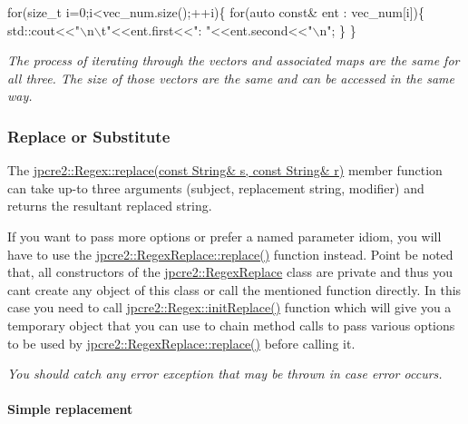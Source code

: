 \begin{DoxyCode}
\textcolor{keywordflow}{for}(\textcolor{keywordtype}{size\_t} i=0;i<vec\_num.size();++i)\{
    \textcolor{keywordflow}{for}(\textcolor{keyword}{auto} \textcolor{keyword}{const}& ent : vec\_num[i])\{
        std::cout<<\textcolor{stringliteral}{"\(\backslash\)n\(\backslash\)t"}<<ent.first<<\textcolor{stringliteral}{": "}<<ent.second<<\textcolor{stringliteral}{"\(\backslash\)n"};
    \}
\}
\end{DoxyCode}


{\itshape The process of iterating through the vectors and associated maps are the same for all three. The size of those vectors are the same and can be accessed in the same way.}\hypertarget{index_replace}{}\subsubsection{Replace or Substitute}\label{index_replace}
The {\ttfamily \hyperlink{classjpcre2_1_1Regex_addd7c21abd0f4cf6c532a7602cfb5835}{jpcre2\+::\+Regex\+::replace(const String\& s, const String\& r)}} member function can take up-\/to three arguments (subject, replacement string, modifier) and returns the resultant replaced string.

If you want to pass more options or prefer a named parameter idiom, you will have to use the {\ttfamily \hyperlink{classjpcre2_1_1RegexReplace_afd087fa7a9bfedec802d1a3dd7edbdd0}{jpcre2\+::\+Regex\+Replace\+::replace()}} function instead. Point be noted that, all constructors of the {\ttfamily \hyperlink{classjpcre2_1_1RegexReplace}{jpcre2\+::\+Regex\+Replace}} class are private and thus you can\textquotesingle{}t create any object of this class or call the mentioned function directly. In this case you need to call {\ttfamily \hyperlink{classjpcre2_1_1Regex_ae7235a991492fa88f1bd3fb02d59cd0a}{jpcre2\+::\+Regex\+::init\+Replace()}} function which will give you a temporary object that you can use to chain method calls to pass various options to be used by {\ttfamily \hyperlink{classjpcre2_1_1RegexReplace_afd087fa7a9bfedec802d1a3dd7edbdd0}{jpcre2\+::\+Regex\+Replace\+::replace()}} before calling it.

{\itshape You should catch any error exception that may be thrown in case error occurs.}\hypertarget{index_simple-replace}{}\paragraph{Simple replacement}\label{index_simple-replace}

